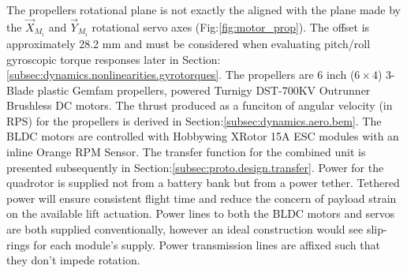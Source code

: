 The propellers rotational plane is not exactly the aligned with the plane made by the $\vec{X}_{M_i}$ and $\vec{Y}_{M_i}$ rotational servo axes (Fig:\ref{fig:motor_prop}). The offset is approximately 28.2 mm and must be considered when evaluating pitch/roll gyroscopic torque responses later in Section:\ref{subsec:dynamics.nonlinearities.gyrotorques}. The propellers are 6 inch ($6 \times 4$) 3-Blade plastic Gemfam propellers, powered Turnigy DST-700KV Outrunner Brushless DC motors. The thrust produced as a funciton of angular velocity (in RPS) for the propellers is derived in Section:\ref{subsec:dynamics.aero.bem}. The BLDC motors are controlled with Hobbywing XRotor 15A ESC modules with an inline Orange RPM Sensor. The transfer function for the combined unit is presented subsequently in Section:\ref{subsec:proto.design.transfer}. Power for the quadrotor is supplied not from a battery bank but from a power tether. Tethered power will ensure consistent flight time and reduce the concern of payload strain on the available lift actuation. Power lines to both the BLDC motors and servos are both supplied conventionally, however an ideal construction would see slip-rings for each module's supply. Power transmission lines are affixed such that they don't impede rotation. 
